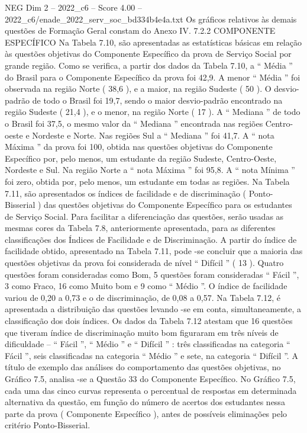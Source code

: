 \begin{textsample}{NEG Dim 2 – 2022\_c6 – Score 4.00 – 2022\_c6/enade\_2022\_serv\_soc\_bd334b4e4a.txt}
Os gráficos relativos às demais questões de Formação Geral constam do Anexo IV. 7.2.2 COMPONENTE ESPECÍFICO Na Tabela 7.10, são apresentadas as estatísticas básicas em relação às questões objetivas do Componente Específico da prova de Serviço Social por grande região.
Como se verifica, a partir dos dados da Tabela 7.10, a “ Média ” do Brasil para o Componente Específico da prova foi 42,9.
A menor “ Média ” foi observada na região Norte ( 38,6 ), e a maior, na região Sudeste ( 50 ).
O desvio-padrão de todo o Brasil foi 19,7, sendo o maior desvio-padrão encontrado na região Sudeste ( 21,4 ), e o menor, na região Norte ( 17 ).
A “ Mediana ” de todo o Brasil foi 37,5, o mesmo valor da “ Mediana ” encontrada nas regiões Centro-oeste e Nordeste e Norte.
Nas regiões Sul a “ Mediana ” foi 41,7.
A “ nota Máxima ” da prova foi 100, obtida nas questões objetivas do Componente Específico por, pelo menos, um estudante da região Sudeste, Centro-Oeste, Nordeste e Sul.
Na região Norte a “ nota Máxima ” foi 95,8.
A “ nota Mínima ” foi zero, obtida por, pelo menos, um estudante em todas as regiões.
Na Tabela 7.11, são apresentados os índices de facilidade e de discriminação ( Ponto-Bisserial ) das questões objetivas do Componente Específico para os estudantes de Serviço Social.
Para facilitar a diferenciação das questões, serão usadas as mesmas cores da Tabela 7.8, anteriormente apresentada, para as diferentes classificações dos Índices de Facilidade e de Discriminação.
A partir do índice de facilidade obtido, apresentado na Tabela 7.11, pode -se concluir que a maioria das questões objetivas da prova foi considerada de nível “ Difícil ” ( 13 ).
Quatro questões foram consideradas como Bom, 5 questões foram consideradas “ Fácil ”, 3 como Fraco, 16 como Muito bom e 9 como “ Médio ”.
O índice de facilidade variou de 0,20 a 0,73 e o de discriminação, de 0,08 a 0,57.
Na Tabela 7.12, é apresentada a distribuição das questões levando -se em conta, simultaneamente, a classificação dos dois índices.
Os dados da Tabela 7.12 atestam que 16 questões que tiveram índice de discriminação muito bom figuraram em três níveis de dificuldade – “ Fácil ”, “ Médio ” e “ Difícil ” : três classificadas na categoria “ Fácil ”, seis classificadas na categoria “ Médio ” e sete, na categoria “ Difícil ”.
A título de exemplo das análises do comportamento das questões objetivas, no Gráfico 7.5, analisa -se a Questão 33 do Componente Específico.
No Gráfico 7.5, cada uma das cinco curvas representa o percentual de respostas em determinada alternativa da questão, em função do número de acertos dos estudantes nessa parte da prova ( Componente Específico ), antes de possíveis eliminações pelo critério Ponto-Bisserial.

\end{textsample}
